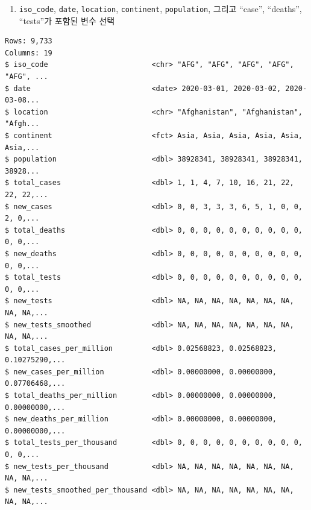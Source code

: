 \documentclass[
  11pt,
]{krantz}
\newenvironment{Shaded}{\begin{snugshade}}{\end{snugshade}}
\newcommand{\KeywordTok}[1]{\textcolor[rgb]{0.27,0.27,0.27}{\textbf{#1}}}
\newcommand{\NormalTok}[1]{#1}
\newcommand{\OperatorTok}[1]{\textcolor[rgb]{0.43,0.43,0.43}{\textbf{#1}}}
\newcommand{\StringTok}[1]{\textcolor[rgb]{0.5,0.5,0.5}{#1}}
\providecommand{\tightlist}{%
  \setlength{\itemsep}{0pt}\setlength{\parskip}{0pt}}
\begin{document}
\normalsize

\begin{enumerate}
\def\labelenumi{\arabic{enumi}.}
\setcounter{enumi}{7}
\tightlist
\item
  \texttt{iso\_code}, \texttt{date}, \texttt{location}, \texttt{continent}, \texttt{population}, 그리고 ``case'', ``deaths'', ``tests''가 포함된 변수 선택
\end{enumerate}

\footnotesize

\begin{Shaded}
\end{Shaded}

\begin{verbatim}
Rows: 9,733
Columns: 19
$ iso_code                        <chr> "AFG", "AFG", "AFG", "AFG", "AFG", ...
$ date                            <date> 2020-03-01, 2020-03-02, 2020-03-08...
$ location                        <chr> "Afghanistan", "Afghanistan", "Afgh...
$ continent                       <fct> Asia, Asia, Asia, Asia, Asia, Asia,...
$ population                      <dbl> 38928341, 38928341, 38928341, 38928...
$ total_cases                     <dbl> 1, 1, 4, 7, 10, 16, 21, 22, 22, 22,...
$ new_cases                       <dbl> 0, 0, 3, 3, 3, 6, 5, 1, 0, 0, 2, 0,...
$ total_deaths                    <dbl> 0, 0, 0, 0, 0, 0, 0, 0, 0, 0, 0, 0,...
$ new_deaths                      <dbl> 0, 0, 0, 0, 0, 0, 0, 0, 0, 0, 0, 0,...
$ total_tests                     <dbl> 0, 0, 0, 0, 0, 0, 0, 0, 0, 0, 0, 0,...
$ new_tests                       <dbl> NA, NA, NA, NA, NA, NA, NA, NA, NA,...
$ new_tests_smoothed              <dbl> NA, NA, NA, NA, NA, NA, NA, NA, NA,...
$ total_cases_per_million         <dbl> 0.02568823, 0.02568823, 0.10275290,...
$ new_cases_per_million           <dbl> 0.00000000, 0.00000000, 0.07706468,...
$ total_deaths_per_million        <dbl> 0.00000000, 0.00000000, 0.00000000,...
$ new_deaths_per_million          <dbl> 0.00000000, 0.00000000, 0.00000000,...
$ total_tests_per_thousand        <dbl> 0, 0, 0, 0, 0, 0, 0, 0, 0, 0, 0, 0,...
$ new_tests_per_thousand          <dbl> NA, NA, NA, NA, NA, NA, NA, NA, NA,...
$ new_tests_smoothed_per_thousand <dbl> NA, NA, NA, NA, NA, NA, NA, NA, NA,...
\end{verbatim}
\end{document}
